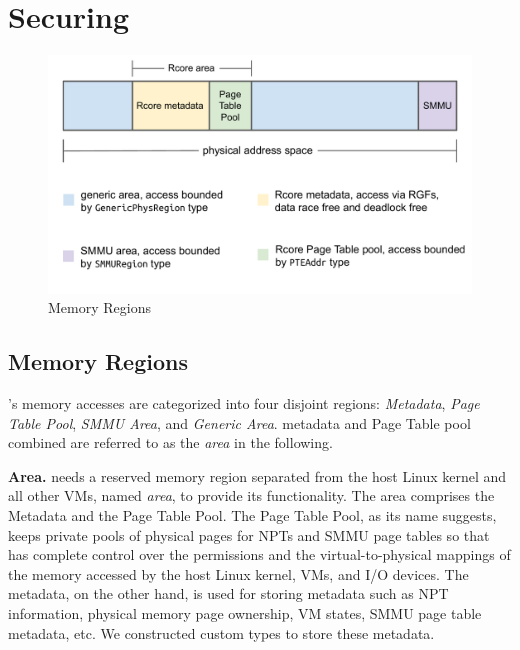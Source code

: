 \chapter{Securing \rustcore{}}
\label{sec:securercore}

%

\begin{figure}[ht]
\centering
\includegraphics[width=1.00\textwidth]{figures/regions.pdf}
\caption{Memory Regions}
\label{fig:regions}
\end{figure}

\section{\rustcore{} Memory Regions}
\label{sec:rcoreregions}

\rustcore{}'s memory accesses are categorized into four disjoint regions:
\textit{\rustcore{} Metadata}, \textit{Page Table Pool},
\textit{SMMU Area}, and \textit{Generic Area}.
\rustcore{} metadata and \rustcore{} Page Table pool combined are referred to as
the \textit{\rustcore{} area} in the following.

\textbf{\rustcore{} Area.}
\rustcore{} needs a reserved memory region separated from the host Linux kernel
and all other VMs, named \textit{\rustcore{} area}, to provide its functionality.
The \rustcore{} area comprises the \rustcore{} Metadata and the \rustcore{} Page Table Pool.
The \rustcore{} Page Table Pool, as its name suggests, keeps private pools of physical pages
for NPTs and SMMU page tables so that \rustcore{} has complete control
over the permissions and the virtual-to-physical mappings of the memory
accessed by the host Linux kernel, VMs, and I/O devices. The \rustcore{} metadata,
on the other hand, is used for storing \rustcore{} metadata such as NPT information,
physical memory page ownership, VM states, SMMU page table metadata, etc.
We constructed custom types to store these \rustcore{} metadata.

